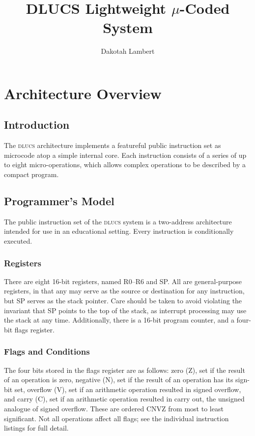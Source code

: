 \documentclass[11pt]{book}
\title{{DLUCS} Lightweight \(\mu\)-Coded System}
\author{Dakotah Lambert}
\date{}
\begin{document}
\maketitle
\frontmatter
\tableofcontents

\mainmatter
\chapter{Architecture Overview}
\section{Introduction}
The \textsc{dlucs} architecture implements
a featureful public instruction set
as microcode atop a simple internal core.
Each instruction consists of a series of up to eight micro-operations,
which allows complex operations to be described by a compact program.

\section{Programmer's Model}
The public instruction set of the \textsc{dlucs} system
is a two-address architecture
intended for use in an educational setting.
Every instruction is conditionally executed.

\subsection{Registers}
There are eight 16-bit registers,
named R0--R6 and SP.
All are general-purpose registers,
in that any may serve as the source or destination
for any instruction,
but SP serves as the stack pointer.
Care should be taken to avoid violating the invariant
that SP points to the top of the stack,
as interrupt processing may use the stack at any time.
Additionally, there is a 16-bit program counter,
and a four-bit flags register.

\subsection{Flags and Conditions}
The four bits stored in the flags register are as follows:
zero (Z), set if the result of an operation is zero,
negative (N), set if the result of an operation has its sign-bit set,
overflow (V), set if an arithmetic operation resulted in signed overflow,
and carry (C), set if an arithmetic operation resulted in carry out,
the unsigned analogue of signed overflow.
These are ordered CNVZ from most to least significant.
Not all operations affect all flags;
see the individual instruction listings for full detail.
\end{document}
